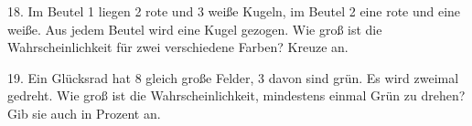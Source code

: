 \documentclass[11pt]{article}
\begin{document}
\begin{pfaufg}{}{18.}{}
Im Beutel 1 liegen 2 rote und 3 weiße Kugeln, im Beutel 2 eine rote und eine weiße. Aus jedem Beutel wird eine Kugel gezogen. Wie groß ist die Wahrscheinlichkeit für zwei verschiedene Farben? Kreuze an.\par\smallskip {}\par {}
\end{pfaufg}

\begin{pfaufg}{}{19.}{}
Ein Glücksrad hat 8 gleich große Felder, 3 davon sind grün. Es wird zweimal gedreht. Wie groß ist die Wahrscheinlichkeit, mindestens einmal Grün zu drehen? Gib sie auch in Prozent an.
\end{pfaufg}
\end{document}
